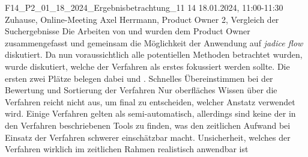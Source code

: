 \fieldnote
{F14\_P2\_01\_18\_2024\_Ergebnisbetrachtung\_11}
{14}
{18.01.2024, 11:00-11:30}
{Zuhause, Online-Meeting}
{Axel Herrmann, Product Owner}
{2, Vergleich der Suchergebnisse}
{
  Die Arbeiten von  und  wurden dem Product Owner zusammengefasst und gemeinsam die Möglichkeit der Anwendung auf \emph{jadice flow} diskutiert.
  Da nun voraussichtlich alle potentiellen Methoden betrachtet wurden, wurde diskutiert, welche der Verfahren als erstes fokussiert werden sollte.
  Die ersten zwei Plätze belegen dabei  und .
}
{
}
{
  Schnelles Übereinstimmen bei der Bewertung und Sortierung der Verfahren
}
{
  Nur oberfläches Wissen über die Verfahren reicht nicht aus, um final zu entscheiden, welcher Anstatz verwendet wird.
  Einige Verfahren gelten als semi-automatisch, allerdings sind keine der in den Verfahren beschriebenen Tools zu finden, was den zeitlichen Aufwand bei Einsatz der Verfahren schwerer einschätzbar macht.
}
{
  Unsicherheit, welches der Verfahren wirklich im zeitlichen Rahmen realistisch anwendbar ist
}

